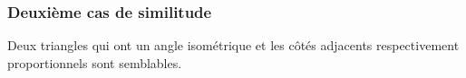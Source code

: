 \documentclass[a4paper,12pt]{article}
\begin{document}
\pagebreak
\subsubsection{Deuxième cas de similitude}
\begin{theorem}
Deux triangles qui ont un angle isométrique et les côtés adjacents respectivement proportionnels sont semblables.
\end{theorem}
\end{document}
